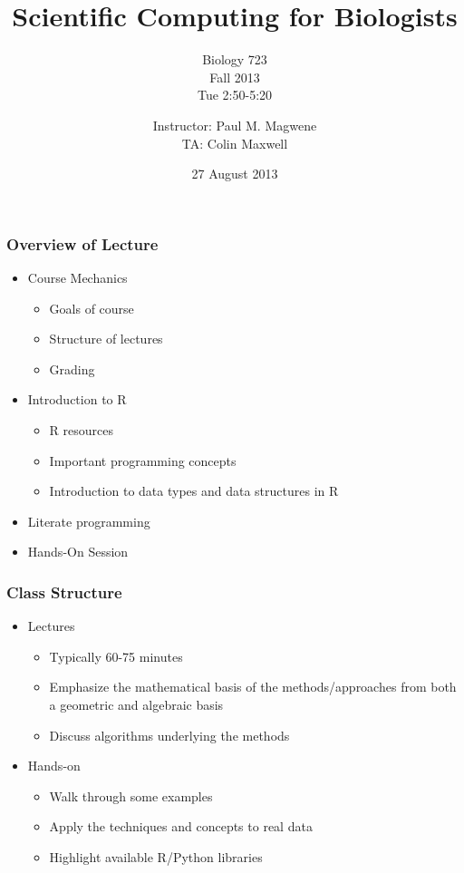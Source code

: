 \documentclass{beamer}
\title{Scientific Computing for Biologists}
\subtitle{Biology 723\\
Fall 2013\\
Tue 2:50-5:20
}
\author[P. Magwene]{Instructor: Paul M. Magwene\\
                    TA: Colin Maxwell}
\institute[Bio 723]{
Email: paul.magwene@duke.edu\\
Phone: 613-8159
}
\date{27 August 2013}
\begin{document}
\begin{frame}
\titlepage
\end{frame}

\begin{frame}
  \frametitle{Overview of Lecture}

\begin{itemize}
		\item Course Mechanics
		\begin{itemize}
			\item Goals of course
			\item Structure of lectures
			\item Grading
		\end{itemize}
		\item Introduction to R
		\begin{itemize}
			\item R resources
			\item Important programming concepts
			\item Introduction to data types and data structures in R 
		\end{itemize}
        \item Literate programming
		\item Hands-On Session
\end{itemize}

\end{frame}


\begin{frame}
  \frametitle{Class Structure}
\begin{itemize}
	\item Lectures

		\begin{itemize}
			\item Typically 60-75 minutes
			\item Emphasize the mathematical basis of the methods/approaches from both a geometric and algebraic basis
			\item Discuss algorithms underlying the methods
		\end{itemize}

	\item Hands-on

			\begin{itemize}
				\item Walk through some examples
				\item Apply the techniques and concepts to real data
				\item Highlight available R/Python libraries
			\end{itemize}

\end{itemize}

\end{frame}
\end{document}
